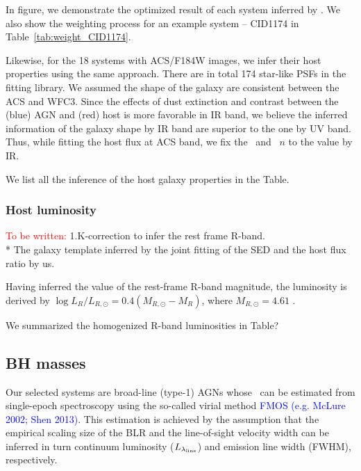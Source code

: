 \documentclass[apj]{emulateapj}
\begin{document}

In figure, we demonstrate the optimized result of each system inferred by \lenstronomy. We also show the weighting process for an example system -- CID1174 in Table~\ref{tab:weight_CID1174}.

Likewise, for the 18 systems with ACS/F184W images, we infer their host properties using the same approach. There are in total 174 star-like PSFs in the fitting library. We assumed the shape of the galaxy are consistent between the ACS and WFC3. Since the effects of dust extinction and contrast between the (blue) AGN and (red) host is more favorable in IR band, we believe the inferred information of the galaxy shape by IR band are superior to the one by UV band. Thus, while fitting the host flux at ACS band, we fix the \Reff\ and \sersic\ $n$ to the value by IR.

We list all the inference of the host galaxy properties in the Table.


\subsubsection{Host luminosity}
\textcolor{red}{To be written:}
1.K-correction to infer the rest frame R-band.\\
* The galaxy template inferred by the joint fitting of the SED and the host flux ratio by us.

Having inferred the value of the rest-frame R-band magnitude, the luminosity is derived by $\log L_R/L_{R, \odot} = 0.4 (M_{R, \odot}-M_R)$, where $M_{R, \odot}=4.61$ \citep{Blanton07}.

We summarized the homogenized R-band luminosities
in Table?

\subsection{BH masses}
\label{mbh}
Our selected systems are broad-line (type-1) AGNs whose \mbh\ can be estimated from single-epoch spectroscopy using the so-called virial method \textcolor{blue}{FMOS (e.g. McLure 2002; Shen 2013)}. This estimation is achieved by the assumption that the empirical scaling size of the BLR and the line-of-sight velocity width can be inferred in turn continuum luminosity ($L _{\lambda_{\rm line}}$) and emission line width (FWHM), respectively.
\end{document}
